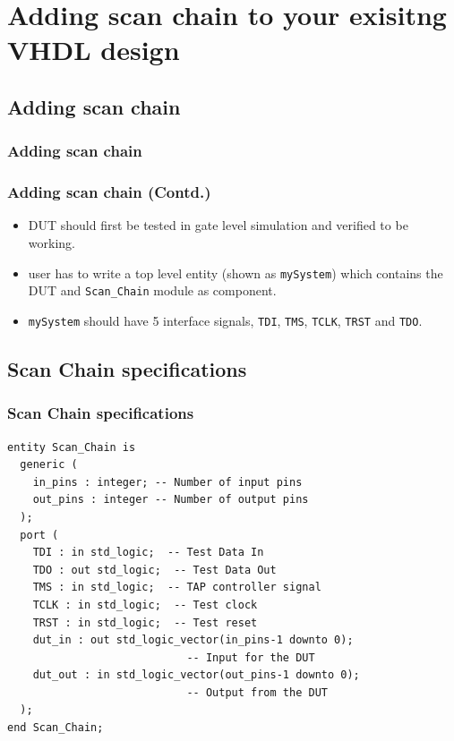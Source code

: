 \documentclass{beamer}
\begin{document}

\section{Adding scan chain to your exisitng VHDL design}
\subsection{Adding scan chain}
\begin{frame}
\frametitle{Adding scan chain}

\begin{figure}[h!]
\centering

\end{figure}

\end{frame}

\begin{frame}
\frametitle{Adding scan chain (Contd.)}
\begin{itemize}
\item DUT should first be tested in gate level simulation and verified to be working.
\item user has to write a top level entity (shown as \texttt{mySystem}) which contains the DUT and \texttt{Scan\_Chain} module as component.
\item \texttt{mySystem} should have 5 interface signals, \texttt{TDI}, \texttt{TMS}, \texttt{TCLK}, \texttt{TRST} and \texttt{TDO}.
\end{itemize}
\end{frame}

\subsection{Scan Chain specifications}

\begin{frame}[fragile]
\frametitle{Scan Chain specifications}

\begin{verbatim}
entity Scan_Chain is
  generic (
    in_pins : integer; -- Number of input pins
    out_pins : integer -- Number of output pins
  );
  port (
    TDI : in std_logic;  -- Test Data In
    TDO : out std_logic;  -- Test Data Out
    TMS : in std_logic;  -- TAP controller signal
    TCLK : in std_logic;  -- Test clock
    TRST : in std_logic;  -- Test reset
    dut_in : out std_logic_vector(in_pins-1 downto 0);  
    						-- Input for the DUT
    dut_out : in std_logic_vector(out_pins-1 downto 0);  
    						-- Output from the DUT
  );
end Scan_Chain;
\end{verbatim}

\end{frame}
\end{document}
